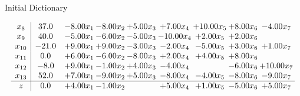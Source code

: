 \documentclass[8pt]{article}
\begin{document}
Initial Dictionary 

\[\begin{array}{c| c c@{\hskip 2pt} c@{\hskip 2pt} c@{\hskip 2pt} c@{\hskip 2pt} c@{\hskip 2pt} c@{\hskip 2pt} c@{\hskip 2pt} }
 x_{8}   &  37.0 & -8.00 x_{1} & -8.00 x_{2} & +  5.00 x_{3} & +  7.00 x_{4} & + 10.00 x_{5} & +  8.00 x_{6} & -4.00 x_{7}\\
 x_{9}   &  40.0 & -5.00 x_{1} & -6.00 x_{2} & -5.00 x_{3} & -10.00 x_{4} & +  2.00 x_{5} & +  2.00 x_{6} &   \\
 x_{10}   &  -21.0 & +  9.00 x_{1} & +  9.00 x_{2} & -3.00 x_{3} & -2.00 x_{4} & -5.00 x_{5} & +  3.00 x_{6} & +  1.00 x_{7}\\
 x_{11}   &  0.0 & +  6.00 x_{1} & -6.00 x_{2} & -8.00 x_{3} & +  2.00 x_{4} & +  4.00 x_{5} & +  8.00 x_{6} &   \\
 x_{12}   &  -8.0 & +  9.00 x_{1} & -1.00 x_{2} & +  4.00 x_{3} & -4.00 x_{4} &   & -6.00 x_{6} & + 10.00 x_{7}\\
 x_{13}   &  52.0 & +  7.00 x_{1} & -9.00 x_{2} & +  5.00 x_{3} & -8.00 x_{4} & -4.00 x_{5} & -8.00 x_{6} & -9.00 x_{7}\\
\hline
z    &  0.0 & +  4.00 x_{1} & -1.00 x_{2} &   & +  5.00 x_{4} & +  1.00 x_{5} & -5.00 x_{6} & +  5.00 x_{7}\\
\end{array}\]
\end{document}
